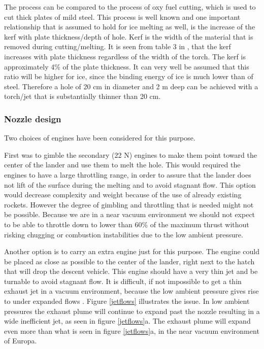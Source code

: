 The process can be compared to the process of oxy fuel cutting, which is used to cut thick plates of mild steel. This process is well known and one important relationship that is assumed to hold for ice melting as well, is the increase of the kerf with plate thickness/depth of hole. Kerf is the width of the material that is removed during cutting/melting. It is seen from table 3 in \cite{oxy_fuel}, that the kerf increases with plate thickness regardless of the width of the torch. The kerf is approximately 4\% of the plate thickness. It can very well be assumed that this ratio will be higher for ice, since the binding energy of ice is much lower than of steel. Therefore a hole of 20 cm in diameter and 2 m deep can be achieved  with a torch/jet that is substantially thinner than 20 cm. 

\subsubsection{Nozzle design}

Two choices of engines have been considered for this purpose. 

First was to gimble the secondary (22 N) engines to make them point toward the center of the lander and use them to melt the hole. This would required the engines to have a large throttling range, in order to assure that the lander does not lift of the surface during the melting and to avoid stagnant flow. This option would decrease complexity and weight because of the use of already existing rockets. However the degree of gimbling and throttling that is needed might not be possible. Because we are in a near vacuum environment we should not expect to be able to throttle down to lower than 60\% of the maximum thrust without risking chugging or combustion instabilities due to the low ambient pressure. \cite{jonas} 

Another option is to carry an extra engine just for this purpose. The engine could be placed as close as possible to the center of the lander, right next to the hatch that will drop the descent vehicle. This engine should have a very thin jet and be turnable to avoid stagnant flow. It is difficult, if not impossible to get a thin exhaust jet in a vacuum environment, because the low ambient pressure gives rise to under expanded flows \cite{spacecraft}. Figure \ref{jetflows} illustrates the issue. In low ambient pressures the exhaust plume will continue to expand past the nozzle resulting in a wide inefficient jet, as seen in figure \ref{jetflows}a. The exhaust plume will expand even more  than what is seen in figure \ref{jetflows}a, in the near vacuum environment of Europa. 

